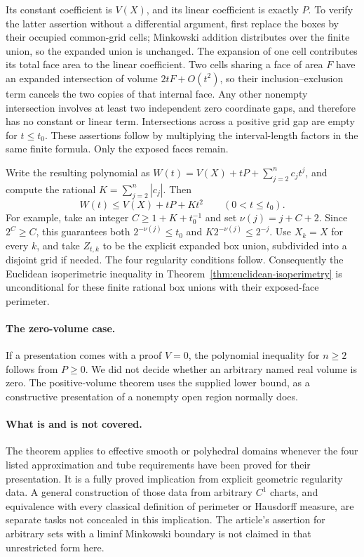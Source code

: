 Its constant coefficient is \(V(X)\), and its linear coefficient is
exactly \(P\). To verify the latter assertion without a differential
argument, first replace the boxes by their occupied common-grid cells;
Minkowski addition distributes over the finite union, so the expanded
union is unchanged. The expansion of one cell contributes its total
face area to the linear coefficient. Two cells sharing a face of area
\(F\) have an expanded intersection of volume \(2tF+O(t^2)\), so
their inclusion--exclusion term cancels the two copies of that internal
face. Any other nonempty intersection involves at least two independent
zero coordinate gaps, and therefore has no constant or linear term.
Intersections across a positive grid gap are empty for \(t\leq t_0\).
These assertions follow by multiplying the interval-length factors in
the same finite formula. Only the exposed faces remain.

Write the resulting polynomial as
\(W(t)=V(X)+tP+\sum_{j=2}^n c_jt^j\), and compute the rational
\(K=\sum_{j=2}^n|c_j|\). Then
\[
 W(t)\leq V(X)+tP+Kt^2\qquad(0<t\leq t_0).
\]
For example, take an integer \(C\geq1+K+t_0^{-1}\) and set
\(\nu(j)=j+C+2\). Since \(2^C\geq C\), this guarantees both
\(2^{-\nu(j)}\leq t_0\) and
\(K2^{-\nu(j)}\leq2^{-j}\).
Use \(X_k=X\) for every \(k\), and take \(Z_{t,k}\) to be the
explicit expanded box union, subdivided into a disjoint grid if needed.
The four regularity conditions follow. Consequently the Euclidean
isoperimetric inequality in Theorem~\ref{thm:euclidean-isoperimetry}
is unconditional for these finite rational box unions with their
exposed-face perimeter.

\paragraph{The zero-volume case.}
If a presentation comes with a proof \(V=0\), the polynomial inequality
for \(n\geq2\) follows from \(P\geq0\). We did not decide whether
an arbitrary named real volume is zero. The positive-volume theorem uses
the supplied lower bound, as a constructive presentation of a nonempty
open region normally does.

\paragraph{What is and is not covered.}
The theorem applies to effective smooth or polyhedral domains whenever
the four listed approximation and tube requirements have been proved
for their presentation. It is a fully proved implication from explicit
geometric regularity data. A general construction of those data from
arbitrary \(C^1\) charts, and equivalence with every classical definition
of perimeter or Hausdorff measure, are separate tasks not concealed in
this implication. The article's assertion for arbitrary sets with a
liminf Minkowski boundary is not claimed in that unrestricted form here.

